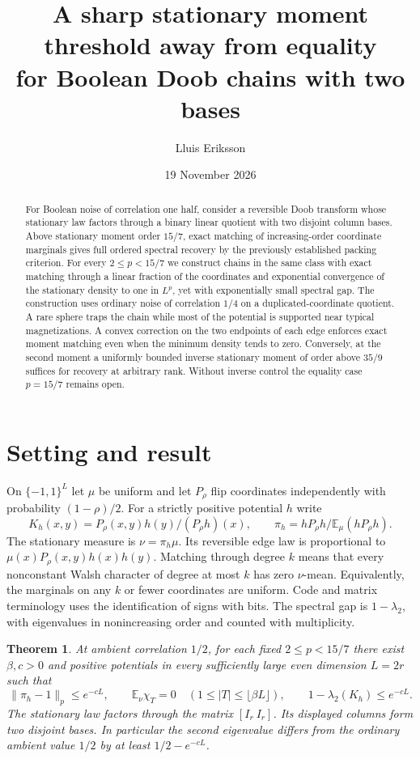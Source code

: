 \documentclass[11pt]{article}
\title{A sharp stationary moment threshold away from equality\\for Boolean Doob chains with two bases}
\author{Lluis Eriksson}
\date{19 November 2026}
\newtheorem{theorem}{Theorem}
\newcommand{\E}{\mathbb E}
\begin{document}
\maketitle
\begin{abstract}
For Boolean noise of correlation one half, consider a reversible Doob transform whose stationary law factors through a binary linear quotient with two disjoint column bases. Above stationary moment order $15/7$, exact matching of increasing-order coordinate marginals gives full ordered spectral recovery by the previously established packing criterion. For every $2\le p<15/7$ we construct chains in the same class with exact matching through a linear fraction of the coordinates and exponential convergence of the stationary density to one in $L^p$, yet with exponentially small spectral gap. The construction uses ordinary noise of correlation $1/4$ on a duplicated-coordinate quotient. A rare sphere traps the chain while most of the potential is supported near typical magnetizations. A convex correction on the two endpoints of each edge enforces exact moment matching even when the minimum density tends to zero. Conversely, at the second moment a uniformly bounded inverse stationary moment of order above $35/9$ suffices for recovery at arbitrary rank. Without inverse control the equality case $p=15/7$ remains open.
\end{abstract}

\section{Setting and result}
On $\{-1,1\}^L$ let $\mu$ be uniform and let $P_\rho$ flip coordinates independently with probability $(1-\rho)/2$. For a strictly positive potential $h$ write
\[
 K_h(x,y)=P_\rho(x,y)h(y)/(P_\rho h)(x),\qquad
 \pi_h=hP_\rho h/\E_\mu(hP_\rho h).
\]
The stationary measure is $\nu=\pi_h\mu$. Its reversible edge law is proportional to $\mu(x)P_\rho(x,y)h(x)h(y)$. Matching through degree $k$ means that every nonconstant Walsh character of degree at most $k$ has zero $\nu$-mean. Equivalently, the marginals on any $k$ or fewer coordinates are uniform. Code and matrix terminology uses the identification of signs with bits. The spectral gap is $1-\lambda_2$, with eigenvalues in nonincreasing order and counted with multiplicity.

\begin{theorem}\label{two}
At ambient correlation $1/2$, for each fixed $2\le p<15/7$ there exist $\beta,c>0$ and positive potentials in every sufficiently large even dimension $L=2r$ such that
\[
 \|\pi_h-1\|_{p}\le e^{-cL},\qquad
 \E_\nu\chi_T=0\quad(1\le |T|\le\lfloor\beta L\rfloor),\qquad
 1-\lambda_2(K_h)\le e^{-cL}.
\]
The stationary law factors through the matrix $[I_r\ I_r]$. Its displayed columns form two disjoint bases. In particular the second eigenvalue differs from the ordinary ambient value $1/2$ by at least $1/2-e^{-cL}$.
\end{theorem}
\end{document}
